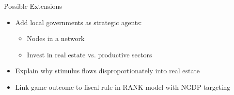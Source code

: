 \documentclass{beamer}
\begin{document}
\begin{frame}{Possible Extensions}
\begin{itemize}
    \item Add local governments as strategic agents:
    \begin{itemize}
        \item Nodes in a network
        \item Invest in real estate vs. productive sectors
    \end{itemize}
    \item Explain why stimulus flows disproportionately into real estate
    \item Link game outcome to fiscal rule in RANK model with NGDP targeting
\end{itemize}
\end{frame}
\end{document}
